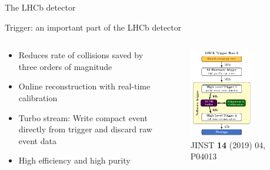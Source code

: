 \documentclass[dvipsnames]{beamer}
\begin{document}
\begin{frame}{The LHCb detector}
  \begin{center}
    {\Large Trigger: an important part of the LHCb detector}
  \end{center}
  \begin{columns}
    \begin{column}{0.5\textwidth}
      \begin{itemize}
        \setlength\itemsep{1.0em}
        \item{Reduces rate of collisions saved by three orders of magnitude}
        \item{Online reconstruction with real-time calibration}
        \item{Turbo stream: Write compact event directly from trigger and discard raw event data}
        \item{High efficiency and high purity}
      \end{itemize}
    \end{column}
    \begin{column}{0.5\textwidth}
      \begin{figure}
        \centering
        \includegraphics[width=0.7\textwidth]{Plots/LHCb_Run2_Trigger_Diagram.pdf}
        \vspace{-0.4cm}
        \caption*{\tiny JINST \textbf{14} (2019) 04, P04013}
      \end{figure}
    \end{column}
  \end{columns}
\end{frame}
\end{document}
